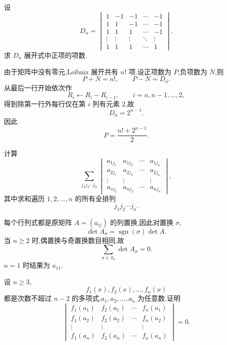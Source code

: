 \begin{example}
设
\[
D_n=
\begin{vmatrix}
1&-1&-1&\cdots&-1\\
1&1&-1&\cdots&-1\\
1&1&1&\cdots&-1\\
\vdots&\vdots&\vdots&\ddots&\vdots\\
1&1&1&\cdots&1
\end{vmatrix}.
\]
求 $D_n$ 展开式中正项的项数.
\end{example}
\exampleblank

\begin{solution}
由于矩阵中没有零元,Leibniz 展开共有 $n!$ 项.设正项数为 $P$,负项数为 $N$,则
\[
P+N=n!,
\qquad
P-N=D_n.
\]
从最后一行开始依次作
\[
R_i\longleftarrow R_i-R_{i-1},
\qquad i=n,n-1,\ldots,2,
\]
得到除第一行外每行仅在第 $i$ 列有元素 $2$,故
\[
D_n=2^{n-1}.
\]
因此
\[
\boxed{
P=\dfrac{n!+2^{n-1}}{2}
}.
\]
\end{solution}


\begin{example}
计算
\[
\displaystyle\sum_{j_1j_2\cdots j_n}
\begin{vmatrix}
a_{1j_1}&a_{1j_2}&\cdots&a_{1j_n}\\
a_{2j_1}&a_{2j_2}&\cdots&a_{2j_n}\\
\vdots&\vdots&&\vdots\\
a_{nj_1}&a_{nj_2}&\cdots&a_{nj_n}
\end{vmatrix},
\]
其中求和遍历 $1,2,\ldots,n$ 的所有全排列
\[
j_1j_2\cdots j_n.
\]
\end{example}
\exampleblank

\begin{solution}
每个行列式都是原矩阵 $A=(a_{ij})$ 的列置换,因此对置换 $\sigma$,
\[
\det A_\sigma
=
\operatorname{sgn}(\sigma)\det A.
\]
当 $n\geq2$ 时,偶置换与奇置换数目相同,故
\[
\boxed{
\sum_{\sigma\in S_n}\det A_\sigma=0
}.
\]
$n=1$ 时结果为 $a_{11}$.
\end{solution}


\begin{example}[\markstar]
设 $n\geq3$,
\[
f_1(x),f_2(x),\ldots,f_n(x)
\]
都是次数不超过 $n-2$ 的多项式,$a_1,a_2,\ldots,a_n$ 为任意数.证明
\[
\begin{vmatrix}
f_1(a_1)&f_2(a_1)&\cdots&f_n(a_1)\\
f_1(a_2)&f_2(a_2)&\cdots&f_n(a_2)\\
\vdots&\vdots&&\vdots\\
f_1(a_n)&f_2(a_n)&\cdots&f_n(a_n)
\end{vmatrix}
=0.
\]
\end{example}
\exampleblank

